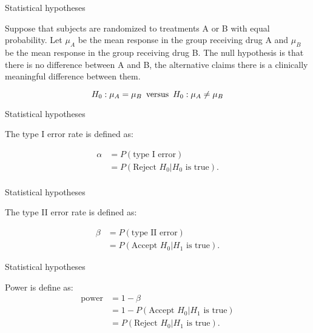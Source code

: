 \documentclass[ignorenonframetext,]{beamer}
\begin{document}
\begin{frame}{Statistical hypotheses}

Suppose that subjects are randomized to treatments A or B with equal
probability. Let \(\mu_A\) be the mean response in the group receiving
drug A and \(\mu_B\) be the mean response in the group receiving drug B.
The null hypothesis is that there is no difference between A and B, the
alternative claims there is a clinically meaningful difference between
them.

\[H_0:\mu_A=\mu_B \thinspace \text{ versus } \thinspace H_0:\mu_A \ne \mu_B \]

\end{frame}

\begin{frame}{Statistical hypotheses}

The type I error rate is defined as:

\[\begin{aligned}
\alpha &=P\left(\text{type I error}\right) \\
       &=P\left(\text{Reject } H_0|H_0 \text{ is true}\right).\\
\end{aligned}\]

\end{frame}

\begin{frame}{Statistical hypotheses}

The type II error rate is defined as:

\[\begin{aligned}
\beta&=P\left(\text{type II error}\right) \\
     &=P\left(\text{Accept }H_0|H_1 \text{ is true}\right).   
\end{aligned}\]

\end{frame}

\begin{frame}{Statistical hypotheses}

Power is define as: \[ \begin{aligned}
\text {power} &= 1-\beta \\
              &= 1-P\left(\text{Accept }H_0|H_1 \text{ is true}\right) \\
              &= P\left(\text{Reject } H_0|H_1 \text{ is true}\right).
\end{aligned}\]

\end{frame}
\end{document}
